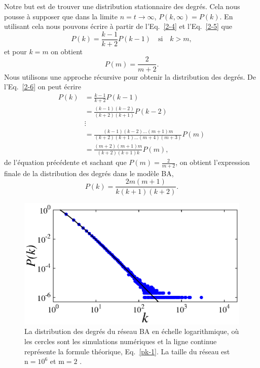 Notre but est de trouver une distribution stationnaire des degrés. Cela nous pousse à supposer que dans la limite $n=t\longrightarrow \infty$, $P(k,\infty)=P(k)$. En utilisant cela nous pouvons écrire à partir de l'Eq.~\eqref{2-4} et l'Eq.~\eqref{2-5} que
\begin{equation}
P(k)=\frac{k-1}{k+2}P(k-1) \quad \text{si}\quad k>m,
\label{2-6}
\end{equation}
et pour $k=m$ on obtient
\begin{equation}
P(m)=\frac{2}{m+2}.
\end{equation}
Nous utilisons une approche récursive pour obtenir la distribution des degrés. De l'Eq.~\eqref{2-6} on peut écrire
\begin{align}
P(k)&=\frac{k-1}{k+2}P(k-1)\nonumber\\
&=\frac{(k-1)(k-2)}{(k+2)(k+1)}P(k-2)\nonumber\\
&\vdots\nonumber\\
&=\frac{(k-1)(k-2)...(m+1)m}{(k+2)(k+1)...(m+4)(m+3)}P(m)\nonumber\\
&=\frac{(m+2)(m+1)m}{(k+2)(k+1)k}P(m),
\end{align}
de l'équation précédente et sachant que $P(m)=\frac{2}{m+2}$, on obtient l'expression finale de la distribution des degrés dans le modèle BA,
\begin{equation}
P(k)=\dfrac{2m(m+1)}{k(k+1)(k+2)}.
\label{pk-1}
\end{equation}
\begin{figure}[h!]
	\centering
	\includegraphics[scale=1]{./figures/fig-barabasi}
	\caption{La distribution des degrés du réseau BA en échelle logarithmique, où les cercles sont les simulations numériques et la ligne continue représente la formule théorique, Eq.~\eqref{pk-1}. La taille du réseau est $\mathrm{n}=10^{6}$ et $\mathrm{m}=2$ .}	
	\label{BA-distribution}
\end{figure}
